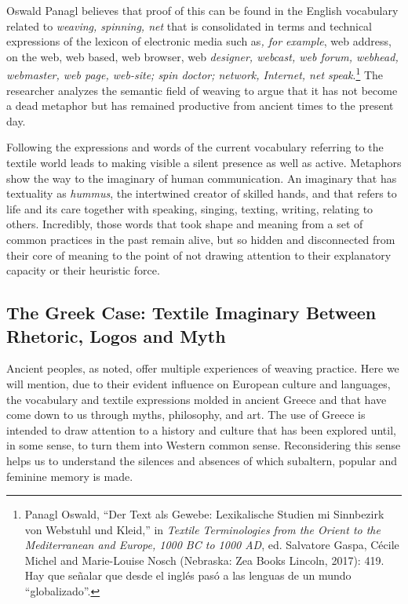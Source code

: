 \documentclass{tufte-handout}
\begin{document}
Oswald Panagl believes that proof of this can be found in the English
vocabulary related to \emph{weaving, spinning, net} that is consolidated
in terms and technical expressions of the lexicon of electronic media
such as\emph{, for example}, web address, on the web, web based, web
browser, web \emph{designer, webcast, web forum, webhead, webmaster, web
page, web-site; spin doctor; network, Internet, net speak}.\footnote{Panagl
  Oswald, ``Der Text als Gewebe: Lexikalische Studien mi Sinnbezirk von
  Webstuhl und Kleid,'' in \emph{Textile Terminologies from the Orient
  to the Mediterranean and Europe, 1000 BC to 1000 AD}, ed. Salvatore
  Gaspa, Cécile Michel and Marie-Louise Nosch (Nebraska: Zea Books
  Lincoln, 2017): 419. Hay que señalar que desde el inglés pasó a las
  lenguas de un mundo ``globalizado''.} The researcher analyzes the
semantic field of weaving to argue that it has not become a dead
metaphor but has remained productive from ancient times to the present
day.

Following the expressions and words of the current vocabulary referring
to the textile world leads to making visible a silent presence as well
as active. Metaphors show the way to the imaginary of human
communication. An imaginary that has textuality as \emph{hummus}, the
intertwined creator of skilled hands, and that refers to life and its
care together with speaking, singing, texting, writing, relating to
others. Incredibly, those words that took shape and meaning from a set
of common practices in the past remain alive, but so hidden and
disconnected from their core of meaning to the point of not drawing
attention to their explanatory capacity or their heuristic force.

\hypertarget{the-greek-case-textile-imaginary-between-rhetoric-logos-and-myth}{%
\subsection{The Greek Case: Textile Imaginary
Between Rhetoric, Logos and
Myth}\label{the-greek-case-textile-imaginary-between-rhetoric-logos-and-myth}}

Ancient peoples, as noted, offer multiple experiences of weaving
practice. Here we will mention, due to their evident influence on
European culture and languages, the vocabulary and textile expressions
molded in ancient Greece and that have come down to us through myths,
philosophy, and art. The use of Greece is intended to draw attention to
a history and culture that has been explored until, in some sense, to
turn them into Western common sense. Reconsidering this sense helps us
to understand the silences and absences of which subaltern, popular and
feminine memory is made.
\end{document}
